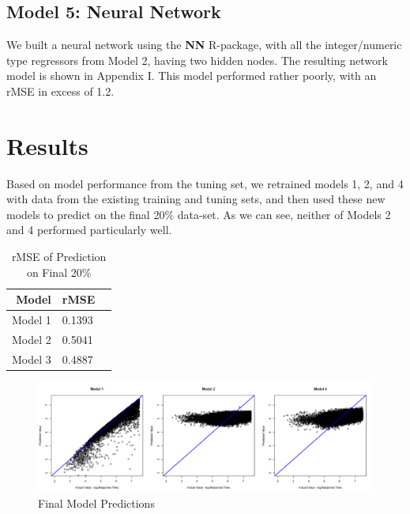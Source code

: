 \documentclass[twoside,11pt]{article}
\begin{document}
\subsection{Model 5: Neural Network}

We built a neural network using the \textbf{NN} R-package, with all the integer/numeric type regressors from Model 2, having two hidden nodes. The resulting network model is shown in Appendix I. This model performed rather poorly, with an rMSE in excess of 1.2.  

\section{Results}

Based on model performance from the tuning set, we retrained models 1, 2, and 4 with data from the existing training and tuning sets, and then used these new models to predict on the final 20\% data-set. As we can see, neither of Models 2 and 4 performed particularly well.

\begin{table}[H]
\centering
\begin{tabular}{rll}
  \hline
 Model & rMSE \\ 
  \hline
Model 1 & 0.1393 \\ 
Model 2 & 0.5041 \\ 
Model 3 & 0.4887 \\ 
   \hline
\end{tabular}
\caption{rMSE of Prediction on Final 20\%} 
\end{table}

\begin{figure}
    \centering
    \includegraphics[width = 1.1\textwidth]{preds.png}
    \caption{Final Model Predictions}
\end{figure}
\end{document}
